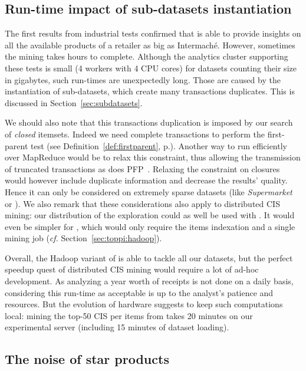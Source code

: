 \subsection{Run-time impact of sub-datasets instantiation}

The first results from industrial tests confirmed that \toppi is able to provide
insights on all the available products of a retailer as big as Intermach\'e.
However, sometimes the mining takes hours to complete.
Although the analytics cluster supporting these tests is small (4 workers with 4 CPU cores)
for datasets counting their size in gigabytes, such run-times are unexpectedly long.
Those are caused by the instantiation of sub-datasets,
which create many transactions duplicates.
This is discussed in Section~\ref{sec:subdatasets}.

We should also note that this transactions duplication is imposed by our search of {\em closed} itemsets.
Indeed we need complete transactions to perform the first-parent test (see Definition~\ref{def:firstparent}, p.\pageref{def:firstparent}).
Another way to run efficiently \toppi over MapReduce would be to relax this constraint,
thus allowing the transmission of truncated transactions as does PFP~\cite{LiRecSys08}.
Relaxing the constraint on closures would however include duplicate information
and decrease the results' quality.
Hence it can only be considered on extremely sparse datasets
(like {\em Supermarket} or \prodassocreceipt).
We also remark that these considerations also apply to distributed CIS mining:
our distribution of the exploration could as well be used with \jlcm.
It would even be simpler for \jlcm, which would only require the items indexation
and a single mining job ({\em cf.} Section~\ref{sec:toppi:hadoop}).

Overall, the Hadoop variant of \toppi is able to tackle all our datasets,
but the perfect speedup quest of distributed CIS mining would require a lot of ad-hoc development.
As analyzing a year worth of receipts is not done on a daily basis,
considering this run-time as acceptable is up to the analyst's patience and resources.
But the evolution of hardware suggests to keep such computations local:
mining the top-50 CIS per items from \prodassocreceipt takes 20 minutes on our experimental server
(including 15 minutes of dataset loading).



\subsection{The noise of star products}
\label{sec:toppi:stars}


